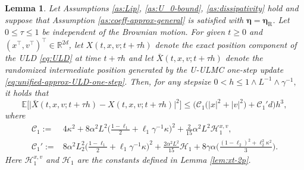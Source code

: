 \documentclass[12pt]{article}
\numberwithin{equation}{section}
\newtheorem{lem}{Lemma}[section]
\begin{document}
\begin{lem}\label{lem:delta_tau_xy}
Let Assumptions \ref{as:Lip}, \ref{as:U_0-bound}, \ref{as:dissipativity} hold and suppose that Assumption \ref{as:coeff-approx-general} is satisfied with $\boldsymbol{\eta}=\boldsymbol{\eta}_\mathrm{R}$. 
Let $0\leq \tau \leq 1$ be independent of the Brownian motion. 
For given $t\geq0$ and $(x^\top,v^\top)^\top \in\mathbb R^{2d}$, let
\(
X(t,x,v;t+\tau h)
\)
denote the exact position component of the ULD \eqref{eq:ULD} at time $t+\tau h$ and  let
\(
\bar X(t,x,v;t+\tau h)
\)
denote the randomized intermediate position generated by the U-ULMC one-step update \eqref{eq:unified-approx-ULD-one-step}. 
Then, for any stepsize
\(
0<h\leq 1\wedge L^{-1} \wedge \gamma^{-1},
\)
it holds that
\begin{equation}
\label{eq:delta-tau-x-bound}
\mathbb{E}
\Big[
\big|
\bar{X}(t,x,v;t+\tau h)
-
X(t,x,v;t+\tau h)
\big|^2
\Big]
\leq
\Big(
\mathcal C_1
\big(
|x|^2+|v|^2
\big)
+
\mathcal C_1'd
\Big)h^3,
\end{equation}
where
\begin{equation}
\label{eq:C1-C1-prime-def}
\begin{aligned}
\mathcal C_1
:=&
4\kappa^2
+
8\alpha^2L^2
\big(
\tfrac{1-\ell_1}{2}
+
\ell_1\gamma^{-1}\kappa
\big)^2
+
\tfrac{2}{15}
\alpha^2L^2
\mathscr H^{x,v}_1,
\\
\mathcal C_1'
:=&
8\alpha^2L_2^2
\big(
\tfrac{1-\ell_1}{2}
+
\ell_1\gamma^{-1}\kappa
\big)^2
+
\tfrac{2\alpha^2L^2}{15}
\mathscr H_1
+
8\gamma\alpha
\big(
\tfrac{(1-\ell_2)^2
+
\ell_2^2\kappa^2}{3}
\big).
\end{aligned}
\end{equation}
Here $\mathscr H^{x,v}_1$ and $\mathscr H_1$ are the constants defined in Lemma \ref{lem:xt-2p}.
\end{lem}
\end{document}
